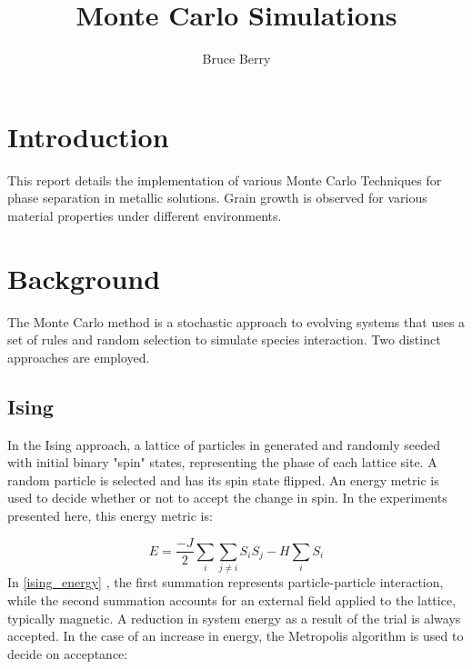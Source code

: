 \documentclass{report}
\begin{document}
    \title{Monte Carlo Simulations}
    \author{Bruce Berry}
    \maketitle

    \section{Introduction}
    This report details the implementation of various Monte Carlo Techniques for phase separation in metallic solutions.  Grain growth is observed for various material properties under different environments.

    \section{Background}
    The Monte Carlo method is a stochastic approach to evolving systems that uses a set of rules and random selection to simulate species interaction.  Two distinct approaches are employed.

    \subsection{Ising}
    In the Ising approach, a lattice of particles in generated and randomly seeded with initial binary "spin" states, representing the phase of each lattice site.  A random particle is selected and has its spin state flipped. An energy metric is used to decide whether or not to accept the change in spin.  In the experiments presented here, this energy metric is:

    \begin{equation} \label{ising_energy}
        E = \frac{-J}{2} \sum_{i} \sum_{j\ne i} S_i S_j - H \sum_{i} S_i
    \end{equation}
    In \eqref{ising_energy} , the first summation represents particle-particle interaction, while the second summation accounts for an external field applied to the lattice, typically magnetic. A reduction in system energy as a result of the trial is always accepted.  In the case of an increase in energy, the Metropolis algorithm is used to decide on acceptance:
\end{document}
